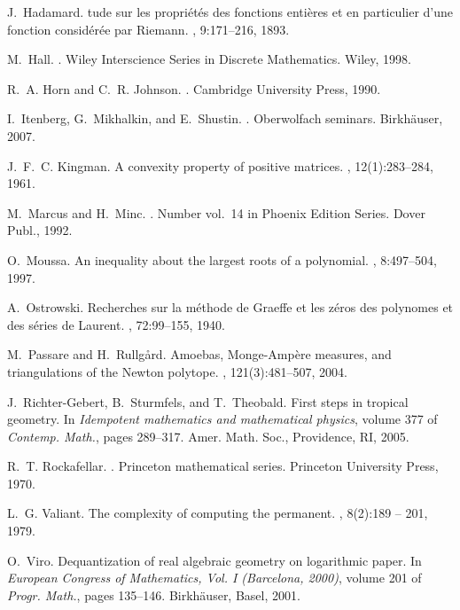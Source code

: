 \documentclass[a4paper]{amsart}
\theoremstyle{definition}
\theoremstyle{plain}
\theoremstyle{remark}
\begin{document}
\begin{thebibliography}{AKNR13}
J.~Hadamard.
tude sur les propri\'et\'es des fonctions enti\`eres et en
  particulier d'une fonction consid\'er\'ee par {R}iemann.
, 9:171--216, 1893.

M.~Hall.
.
\newblock Wiley Interscience Series in Discrete Mathematics. Wiley, 1998.

R.~A. Horn and C.~R. Johnson.
.
\newblock Cambridge University Press, 1990.

I.~Itenberg, G.~Mikhalkin, and E.~Shustin.
.
\newblock Oberwolfach seminars. Birkh\"auser, 2007.

J.~F.~C. Kingman.
\newblock A convexity property of positive matrices.
, 12(1):283--284, 1961.

M.~Marcus and H.~Minc.
.
\newblock Number vol.~14 in Phoenix Edition Series. Dover Publ., 1992.

O.~Moussa.
\newblock An inequality about the largest roots of a polynomial.
,
  8:497--504, 1997.

A.~Ostrowski.
\newblock Recherches sur la m\'ethode de {G}raeffe et les z\'eros des polynomes
  et des s\'eries de {L}aurent.
, 72:99--155, 1940.

M.~Passare and H.~Rullg{\aa}rd.
\newblock Amoebas, {M}onge-{A}mp\`ere measures, and triangulations of the
  {N}ewton polytope.
, 121(3):481--507, 2004.

J.~Richter-Gebert, B.~Sturmfels, and T.~Theobald.
\newblock First steps in tropical geometry.
\newblock In {\em Idempotent mathematics and mathematical physics}, volume 377
  of {\em Contemp. Math.}, pages 289--317. Amer. Math. Soc., Providence, RI,
  2005.

R.~T. Rockafellar.
.
\newblock Princeton mathematical series. Princeton University Press, 1970.

L.~G. Valiant.
\newblock The complexity of computing the permanent.
, 8(2):189 -- 201, 1979.

O.~Viro.
\newblock Dequantization of real algebraic geometry on logarithmic paper.
\newblock In {\em European Congress of Mathematics, Vol. I (Barcelona, 2000)},
  volume 201 of {\em Progr. Math.}, pages 135--146. Birkh\"auser, Basel, 2001.

\end{thebibliography}
\end{document}

